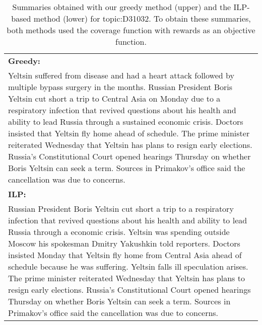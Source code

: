 \documentclass[11pt,a4paper]{article}
\begin{document}
	
	\begin{table*}
		\begin{tabular}{|p{}|}
			\hline 
			{\bf Greedy:}\\
			Yeltsin suffered from disease and had a heart attack followed by multiple bypass surgery in the months.
			Russian President Boris Yeltsin cut short a trip to Central Asia on Monday due to a respiratory infection that revived questions about his health and ability to lead Russia through a sustained economic crisis.
			Doctors insisted that Yeltsin fly home ahead of schedule.
			The prime minister reiterated Wednesday that Yeltsin has plans to resign early elections.
			Russia's Constitutional Court opened hearings Thursday on whether Boris Yeltsin can seek a term.
			Sources in Primakov's office said the cancellation was due to concerns.
			\\ \hline  \hline  %
			{\bf ILP:}\\
			Russian President Boris Yeltsin cut short a trip to a respiratory infection that revived questions about his health and ability to lead Russia through a economic crisis.
			Yeltsin was spending outside Moscow his spokesman Dmitry Yakushkin told reporters.
			Doctors insisted Monday that Yeltsin fly home from Central Asia ahead of schedule because he was suffering.
			Yeltsin falls ill speculation arises.
			The prime minister reiterated Wednesday that Yeltsin has plans to resign early elections.
			Russia's Constitutional Court opened hearings Thursday on whether Boris Yeltsin can seek a term.
			Sources in Primakov's office said the cancellation was due to concerns.
			\\ \hline
		\end{tabular}
		\caption{Summaries obtained with our greedy method (upper) and the ILP-based method (lower) for topic:D31032. 
			To obtain these summaries, 
			both methods used the coverage function with rewards as an objective function.}
		\label{tbl:summary}
	\end{table*}
	
	
	
\end{document}
